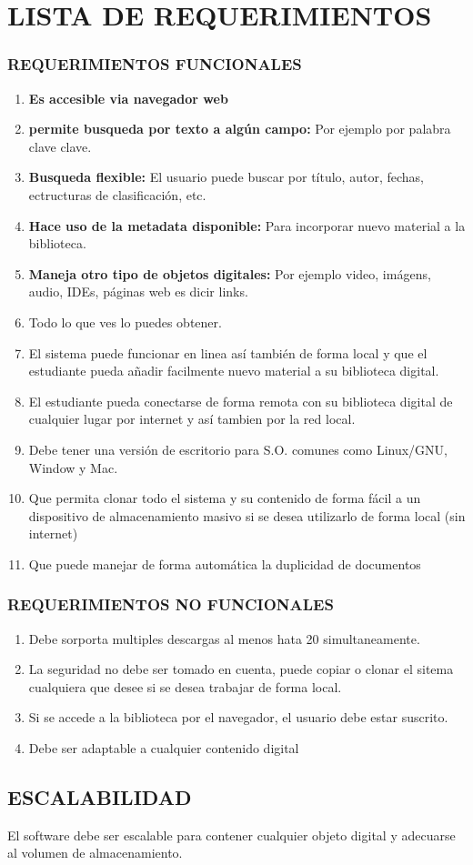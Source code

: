 \chapter*{LISTA DE REQUERIMIENTOS}
\subsection*{REQUERIMIENTOS FUNCIONALES}
\begin{enumerate}
	\item \textbf{Es accesible via navegador web}
	\item \textbf{permite busqueda por texto a algún campo: }Por ejemplo por palabra clave clave.
	\item \textbf{Busqueda flexible:} El usuario puede buscar por título, autor, fechas, ectructuras de clasificación, etc. 
	\item \textbf{Hace uso de la metadata disponible: } Para incorporar nuevo material a la biblioteca. 
	\item \textbf{Maneja otro tipo de objetos digitales: } Por ejemplo video, imágens, audio, IDEs, páginas web es dicir links.
	\item Todo lo que ves lo puedes obtener.
	\item El sistema puede funcionar en linea así también de forma local y que el estudiante pueda añadir facilmente nuevo material a su biblioteca digital. 
	\item El estudiante pueda conectarse de forma remota con su biblioteca digital de cualquier lugar por internet y así tambien por la red local. 
	\item Debe tener una versión de escritorio para S.O. comunes como Linux/GNU, Window y Mac. 
	\item Que permita clonar todo el sistema y su contenido de forma fácil a un dispositivo de almacenamiento masivo si se desea utilizarlo de forma local (sin internet)
	\item Que puede manejar  de forma automática  la duplicidad de documentos
\end{enumerate}

\subsection*{REQUERIMIENTOS NO FUNCIONALES}
\begin{enumerate}
	\item Debe sorporta multiples descargas al menos hata 20 simultaneamente. 
	\item La seguridad no debe ser tomado en cuenta, puede copiar o clonar el sitema cualquiera que desee si se desea trabajar de forma local. 
	\item Si se accede a la biblioteca por el navegador, el usuario debe estar suscrito. 
	\item Debe ser adaptable a cualquier contenido digital
\end{enumerate}
\section*{ESCALABILIDAD} El software debe ser escalable para contener cualquier objeto digital y adecuarse al volumen de almacenamiento.